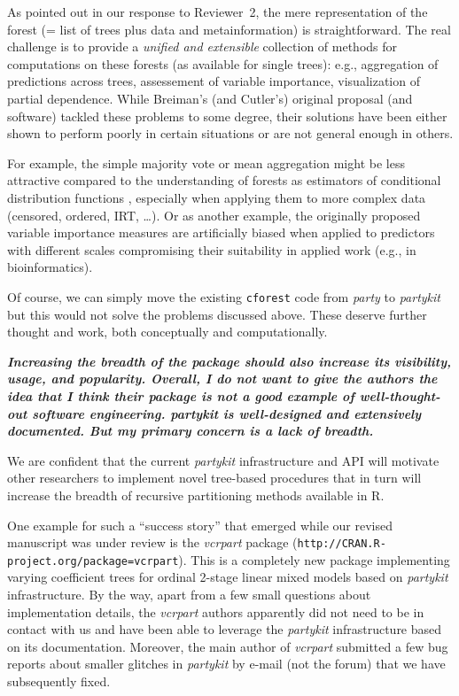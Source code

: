 \documentclass{article}
\begin{document}
\smallskip

As pointed out in our response to Reviewer~2, the mere representation of the
forest (= list of trees plus data and metainformation) is straightforward.
The real challenge is to provide a \emph{unified and extensible} collection of methods
for computations on these forests (as available for single trees): e.g.,
aggregation of predictions across trees, assessement of variable importance,
visualization of partial dependence. While Breiman's (and Cutler's) original
proposal (and software) tackled these problems to some degree, their solutions
have been either shown to perform poorly in certain situations or are not
general enough in others.

For example, the simple majority vote or mean aggregation
might be less attractive compared to the understanding of forests as
estimators of conditional distribution functions \citep{Meinshausen:2006},
especially when applying them to more complex data (censored, ordered, IRT, \dots).
Or as another example, the originally proposed variable importance measures are
artificially biased when applied to predictors with different scales
\citep{Strobl+Boulesteix+Kneib:2008} compromising their suitability in applied
work (e.g., in bioinformatics).

Of course, we can simply move the existing \texttt{cforest} code from \emph{party}
to \emph{partykit} but this would not solve the problems discussed above. These
deserve further thought and work, both conceptually and computationally.

\smallskip

\textbf{\textit{%
Increasing the breadth of the package should also increase its visibility, usage, and popularity.
Overall, I do not want to give the authors the idea that I think their
package is not a good example of well-thought-out software engineering. 
partykit is well-designed and extensively documented.  But my primary
concern is a lack of breadth.
}}

\smallskip

We are confident that the current \emph{partykit} infrastructure and API
will motivate other researchers to implement novel tree-based procedures that
in turn will increase the breadth of recursive partitioning methods available
in \textsf{R}. 

One example for such a ``success story'' that emerged while our revised manuscript was under review
is the \emph{vcrpart} package (\texttt{http://CRAN.R-project.org/package=vcrpart}).
This is a completely new package implementing varying coefficient trees for
ordinal 2-stage linear mixed models based on \emph{partykit} infrastructure.
By the way, apart from a few small questions about implementation
details, the \emph{vcrpart} authors apparently did not need to be in contact with us and have
been able to leverage the \emph{partykit} infrastructure based on its documentation.
Moreover, the main author of \emph{vcrpart} submitted a few bug reports
about smaller glitches in \emph{partykit} by e-mail (not the forum) that we have
subsequently fixed.
\end{document}
